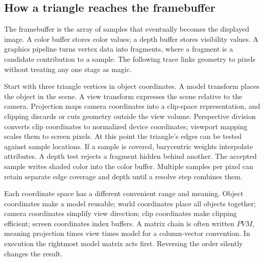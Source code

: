 \subsection{How a triangle reaches the framebuffer}\label{03-visual-computing-i-ch015-how-a-triangle-reaches-the-framebuffer}

\hypertarget{03-visual-computing-i-ch015-how-a-triangle-reaches-the-framebuffer}{}

The framebuffer is the array of samples that eventually becomes the displayed image. A color buffer stores color values; a depth buffer stores visibility values. A graphics pipeline turns vertex data into fragments, where a fragment is a candidate contribution to a sample. The following trace links geometry to pixels without treating any one stage as magic.

Start with three triangle vertices in object coordinates. A model transform places the object in the scene. A view transform expresses the scene relative to the camera. Projection maps camera coordinates into a clip-space representation, and clipping discards or cuts geometry outside the view volume. Perspective division converts clip coordinates to normalized device coordinates; viewport mapping scales them to screen pixels. At this point the triangle's edges can be tested against sample locations. If a sample is covered, barycentric weights interpolate attributes. A depth test rejects a fragment hidden behind another. The accepted sample writes shaded color into the color buffer. Multiple samples per pixel can retain separate edge coverage and depth until a resolve step combines them.

Each coordinate space has a different convenient range and meaning. Object coordinates make a model reusable; world coordinates place all objects together; camera coordinates simplify view direction; clip coordinates make clipping efficient; screen coordinates index buffers. A matrix chain is often written \(PVM\), meaning projection times view times model for a column-vector convention. In execution the rightmost model matrix acts first. Reversing the order silently changes the result.

